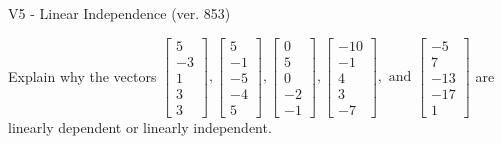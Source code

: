 \begin{exercise}
  \begin{exerciseTitle}V5 - Linear Independence (ver. 853)\end{exerciseTitle}
  \begin{exerciseStatement}
    Explain why the vectors \(\left[\begin{array}{r}
5 \\
-3 \\
1 \\
3 \\
3
\end{array}\right] , \left[\begin{array}{r}
5 \\
-1 \\
-5 \\
-4 \\
5
\end{array}\right] , \left[\begin{array}{r}
0 \\
5 \\
0 \\
-2 \\
-1
\end{array}\right] , \left[\begin{array}{r}
-10 \\
-1 \\
4 \\
3 \\
-7
\end{array}\right] , \text{ and } \left[\begin{array}{r}
-5 \\
7 \\
-13 \\
-17 \\
1
\end{array}\right]\) are linearly dependent or linearly independent.	



\end{exerciseStatement}
\end{exercise}
